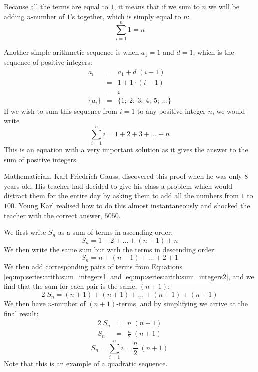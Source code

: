 Because all the terms are equal to $1$, it means that if we sum to $n$ we will be adding $n$-number of $1$'s together, which is simply equal to $n$:
\begin{equation}
\boxed{\sum_{i=1}^n 1 = n}
\end{equation}

Another simple arithmetic sequence is when $a_1=1$ and $d=1$, which is the sequence of positive integers:
\begin{eqnarray*}
a_i &=& a_1 + d \; (i - 1) \\
&=& 1 + 1 \cdot (i - 1) \\
&=& i \\
\{a_i\} &=& \{1; \: 2; \: 3; \: 4; \: 5; \: \ldots \}
\end{eqnarray*}
If we wish to sum this sequence from $i=1$ to any positive integer $n$, we would write
\begin{equation}
\label{eq:mp:se:fa:simple:sum1}
\sum_{i=1}^n i = 1 + 2 + 3 + \ldots + n
\end{equation}
This is an equation with a very important solution as it gives the answer to the sum of positive integers.

\begin{IFact}{Mathematician, Karl Friedrich Gauss, discovered this proof when he was only 8 years old. His teacher had decided to give his class a problem which would distract them for the entire day by asking them to add all the numbers from $1$ to $100$. Young Karl realised how to do this almost instantaneously and shocked the teacher with the correct answer, $5050$.}
\end{IFact}

We first write $S_n$ as a sum of terms in ascending order:
\begin{equation}
\label{eq:mp:series:arith:sum_integers1}
S_n = 1 + 2 + \ldots + (n - 1) + n
\end{equation}
\noindent
We then write the same sum but with the terms in descending order:
\begin{equation}
\label{eq:mp:series:arith:sum_integers2}
S_n = n + (n-1) + \ldots + 2 + 1
\end{equation}
We then add corresponding pairs of terms from Equations \eqref{eq:mp:series:arith:sum_integers1} and \eqref{eq:mp:series:arith:sum_integers2}, and we find that the sum for each pair is the same, $(n+1)$:
\begin{equation}
2 \; S_n = (n+1) + (n+1) + \ldots + (n+1) + (n+1)
\end{equation}
We then have $n$-number of $(n+1)$-terms, and by simplifying we arrive at the final result:
\begin{eqnarray*}
2 \; S_n &=& n \; (n + 1) \\
S_n &=& \frac {n}{2} \; (n + 1)
\end{eqnarray*}
\begin{equation}
\label{eq:mp:series:sum_integers}
\boxed{S_n = \sum_{i=1}^n i = \frac {n}{2} \; (n + 1)}
\end{equation}
Note that this is an example of a quadratic sequence.

